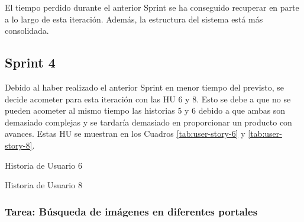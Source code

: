 El tiempo perdido durante el anterior Sprint se ha conseguido recuperar en parte a lo largo de esta iteración. Además, la estructura del sistema está más consolidada.

\subsection{Sprint 4}

Debido al haber realizado el anterior Sprint en menor tiempo del previsto, se decide acometer para esta iteración con las \ac{HU} 6 y 8. Esto se debe a que no se pueden acometer al mismo tiempo las historias 5 y 6 debido a que ambas son demasiado complejas y se tardaría demasiado en proporcionar un producto con avances. Estas \ac{HU} se muestran en los Cuadros \ref{tab:user-story-6} y \ref{tab:user-story-8}.

\begin{table}[hp]
  \centering
  {\small
  
  }
  \caption{Historia de Usuario 6}
  \label{tab:user-story-6}
\end{table}

\begin{table}[hp]
  \centering
  {\small
  
  }
  \caption{Historia de Usuario 8}
  \label{tab:user-story-8}
\end{table}


\subsubsection{Tarea: Búsqueda de imágenes en diferentes portales}

